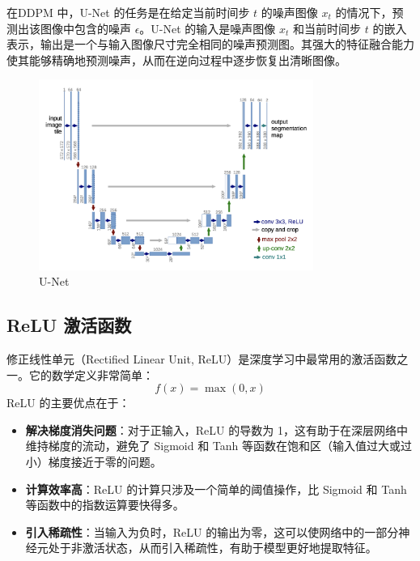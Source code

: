 \documentclass{ctexart}
\begin{document}
\noindent 
在DDPM 中，U-Net 的任务是在给定当前时间步 $t$ 的噪声图像 $x_t$ 的情况下，预测出该图像中包含的噪声 $\epsilon$。U-Net 的输入是噪声图像 $x_t$ 和当前时间步 $t$ 的嵌入表示，输出是一个与输入图像尺寸完全相同的噪声预测图。其强大的特征融合能力使其能够精确地预测噪声，从而在逆向过程中逐步恢复出清晰图像。

 \begin{figure}[htb]
     \centering
     \includegraphics[width=0.8\textwidth]{unet.png}
     \caption{U-Net}
     \label{fig:unet}
 \end{figure}

\subsection{ReLU 激活函数}
\noindent
修正线性单元（Rectified Linear Unit, ReLU）是深度学习中最常用的激活函数之一。它的数学定义非常简单：
$$ f(x) = \max(0, x) $$
ReLU 的主要优点在于：
\begin{itemize}
    \item \textbf{解决梯度消失问题}：对于正输入，ReLU 的导数为 1，这有助于在深层网络中维持梯度的流动，避免了 Sigmoid 和 Tanh 等函数在饱和区（输入值过大或过小）梯度接近于零的问题。
    \item \textbf{计算效率高}：ReLU 的计算只涉及一个简单的阈值操作，比 Sigmoid 和 Tanh 等函数中的指数运算要快得多。
    \item \textbf{引入稀疏性}：当输入为负时，ReLU 的输出为零，这可以使网络中的一部分神经元处于非激活状态，从而引入稀疏性，有助于模型更好地提取特征。
\end{itemize}
\end{document}

